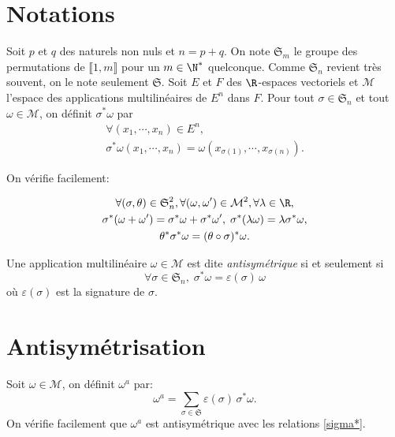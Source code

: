  

\section*{Notations}
Soit $p$ et $q$ des naturels non nuls et $n = p + q$.\newline
On note $\mathfrak{S}_m$ le groupe des permutations de $\llbracket 1, m \rrbracket$ pour un $m\in \N^*$ quelconque. Comme $\mathfrak{S}_n$ revient très souvent, on le note seulement $\mathfrak{S}$.\newline
Soit $E$ et $F$ des $\R$-espaces vectoriels et $\mathcal{M}$ l'espace des applications multilinéaires de $E^n$ dans $F$.\newline
Pour tout $\sigma \in \mathfrak{S}_n$ et tout $\omega\in \mathcal{M}$, on définit $\sigma^* \omega$ par
\begin{multline*}
 \forall (x_1,\cdots,x_n)\in E^n, \\
 \sigma^*\omega(x_1,\cdots,x_n) = \omega(x_{\sigma(1)},\cdots,x_{\sigma(n)}).
\end{multline*}

On vérifie facilement:

\begin{multline} \label{sigma*}
 \forall (\sigma, \theta) \in \mathfrak{S}_{n}^2, \forall(\omega, \omega')\in \mathcal{M}^2, \forall \lambda \in \R,\\
 \sigma^*(\omega + \omega') = \sigma^*\omega + \sigma^*\omega', \;
 \sigma^*(\lambda \omega) = \lambda \sigma^* \omega, \\
 \theta^* \sigma^* \omega = (\theta \circ \sigma)^* \omega.
\end{multline} 

Une application multilinéaire $\omega \in \mathcal{M}$ est dite \emph{antisymétrique} si et seulement si
\[
 \forall \sigma \in \mathfrak{S}_n, \;
 \sigma^* \omega = \varepsilon(\sigma) \,\omega
\]
où $\varepsilon(\sigma)$ est la signature de $\sigma$.

\section*{Antisymétrisation}
Soit $\omega \in \mathcal{M}$, on définit $\omega^a$ par:
\[
 \omega^a = \sum_{\sigma \in \mathfrak{S}} \varepsilon(\sigma)\,\sigma^* \omega.
\]
On vérifie facilement que $\omega^a$ est antisymétrique avec les relations \ref{sigma*}.

